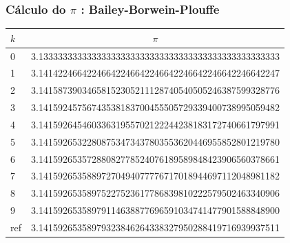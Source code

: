 \documentclass{beamer}
\newcommand\safepi[0]{
	\texorpdfstring{$\pi$}{Pi}
}
\begin{document}
\begin{frame}

\frametitle{Cálculo do \safepi: Bailey-Borwein-Plouffe}

\scriptsize
\renewcommand*{\arraystretch}{1.3}
\begin{table}[h]
	\centering
	\begin{tabular}{|l|c|}
		\hline
		$k$ & $\pi$\\ 
		\hline
		0& 3.13333333333333333333333333333333333333333333333333\\
		1& 3.14142246642246642246642246642246642246642246642247\\
		2& 3.14158739034658152305211128740540505246387599328776\\
		3& 3.14159245756743538183700455505729339400738995059482\\
		4& 3.14159264546033631955702122244238183172740661797991\\
		5& 3.14159265322808753473437803553620446955852801219780\\
		6& 3.14159265357288082778524076189589848423906560378661\\
		7& 3.14159265358897270494077776717018944697112048981182\\
		8& 3.14159265358975227523617786839810222579502463340906\\
		9& 3.14159265358979114638877696591034741477901588848900\\
	   \hline
	   ref& 3.14159265358979323846264338327950288419716939937511\\
	   \hline
	\end{tabular}
\end{table}
\renewcommand*{\arraystretch}{1}
\normalsize
	
\end{frame}

\end{document}
